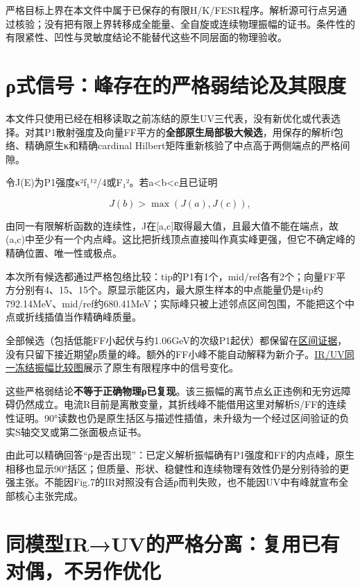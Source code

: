 \documentclass[
  10pt,
  a4paper,
]{article}
\begin{document}
严格目标上界在本文件中属于已保存的有限H/K/FESR程序。解析源可行点另通过核验；没有把有限上界转移成全能量、全自旋或连续物理振幅的证书。条件性的有限紧性、凹性与灵敏度结论不能替代这些不同层面的物理验收。

\newpage

\section{ρ式信号：峰存在的严格弱结论及其限度}\label{ux3c1ux5f0fux4fe1ux53f7ux5cf0ux5b58ux5728ux7684ux4e25ux683cux5f31ux7ed3ux8bbaux53caux5176ux9650ux5ea6}

本文件只使用已经在相移读取之前冻结的原生UV三代表，没有新优化或代表选择。对其P1散射强度及向量FF平方的\textbf{全部原生局部极大候选}，用保存的解析f包络、精确原生κ和精确cardinal
Hilbert矩阵重新核验了中点高于两侧端点的严格间隙。

令J(E)为P1强度κ²\textbar f₁¹\textbar²/4或\textbar F₁\textbar²。若a\textless b\textless c且已证明

\[
J(b)>\max(J(a),J(c)),
\]

由同一有限解析函数的连续性，J在{[}a,c{]}取得最大值，且最大值不能在端点，故(a,c)中至少有一个内点峰。这比把折线顶点直接叫作真实峰更强，但它不确定峰的精确位置、唯一性或极点。

本次所有候选都通过严格包络比较：tip的P1有1个，mid/ref各有2个；向量FF平方分别有4、15、15个。原显示能区内，最大原生样本的中点能量仍是tip约792.14MeV、mid/ref约680.41MeV；实际峰只被上述邻点区间包围，不能把这个中点或折线插值当作精确峰质量。

全部候选（包括低能FF小起伏与约1.06GeV的次级P1起伏）都保留在\href{../../../RHO_SIGNAL_PEAK_EXISTENCE.json}{区间证据}，没有只留下接近期望ρ质量的峰。额外的FF小峰不能自动解释为新介子。\href{../../../../sequential_reproduction_20260910/CE_native_comparison/rho_mechanism.pdf}{IR/UV同一冻结振幅比较图}展示了原生有限程序中的信号变化。

这些严格弱结论\textbf{不等于正确物理ρ已复现}。该三振幅的离节点幺正违例和无穷远障碍仍然成立。电流R目前是离散变量，其折线峰不能借用这里对解析S/FF的连续性证明。90°读数也仍是原生括区与描述性插值，未升级为一个经过区间验证的负实S轴交叉或第二张面极点证书。

由此可以精确回答``ρ是否出现''：已定义解析振幅确有P1强度和FF的内点峰，原生相移也显示90°括区；但质量、形状、稳健性和连续物理有效性仍是分别待验的更强主张。不能因Fig.7的IR对照没有合适ρ而判失败，也不能因UV中有峰就宣布全部核心主张完成。

\newpage

\section{同模型IR→UV的严格分离：复用已有对偶，不另作优化}\label{ux540cux6a21ux578biruvux7684ux4e25ux683cux5206ux79bbux590dux7528ux5df2ux6709ux5bf9ux5076ux4e0dux53e6ux4f5cux4f18ux5316}
\end{document}
